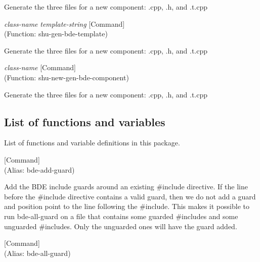 \begin{doc-string}
Generate the three files for a new component: .cpp, .h, and .t.cpp
\end{doc-string}

\vspace{1em}
\noindent
{}
\usebox{\funcname}\emph{class-name} \emph{template-string}
 \hfill [Command]\\%
 (Function: shu-gen-bde-template)

\begin{doc-string}
Generate the three files for a new component: .cpp, .h, and .t.cpp
\end{doc-string}

\vspace{1em}
\noindent
{}
\usebox{\funcname}\emph{class-name}
 \hfill [Command]\\%
 (Function: shu-new-gen-bde-component)

\begin{doc-string}
Generate the three files for a new component: .cpp, .h, and .t.cpp
\end{doc-string}

\subsection{List of functions and variables}

List of functions and variable definitions in this package.



\vspace{1em}
\noindent
{}
\usebox{\funcname}
 \hfill [Command]\\%
 (Alias: bde-add-guard)

\begin{doc-string}
Add the BDE include guards around an existing \#include directive.  If the line
before the \#include directive contains a valid guard, then we do not add a guard
and position point to the line following the \#include.  This makes it possible to
run bde-all-guard on a file that contains some guarded \#includes and some unguarded
\#includes.  Only the unguarded ones will have the guard added.
\end{doc-string}

\vspace{1em}
\noindent
{}
\usebox{\funcname}
 \hfill [Command]\\%
 (Alias: bde-all-guard)

